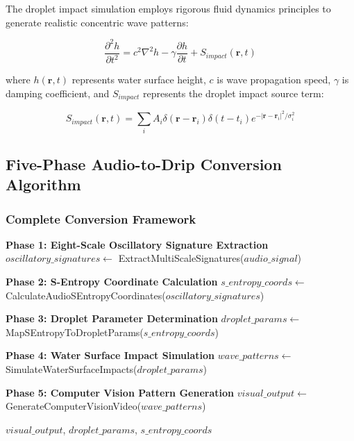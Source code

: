 The droplet impact simulation employs rigorous fluid dynamics principles to generate realistic concentric wave patterns:

\begin{equation}
\frac{\partial^2 h}{\partial t^2} = c^2 \nabla^2 h - \gamma \frac{\partial h}{\partial t} + S_{impact}(\mathbf{r}, t)
\end{equation}

where $h(\mathbf{r}, t)$ represents water surface height, $c$ is wave propagation speed, $\gamma$ is damping coefficient, and $S_{impact}$ represents the droplet impact source term:

\begin{equation}
S_{impact}(\mathbf{r}, t) = \sum_i A_i \delta(\mathbf{r} - \mathbf{r}_i) \delta(t - t_i) e^{-|\mathbf{r} - \mathbf{r}_i|^2/\sigma_i^2}
\end{equation}

\subsection{Five-Phase Audio-to-Drip Conversion Algorithm}

\subsubsection{Complete Conversion Framework}

\begin{algorithm}[H]
\caption{Universal Audio-to-Drip Conversion Algorithm}
\begin{algorithmic}[1]
    \State \textbf{Phase 1: Eight-Scale Oscillatory Signature Extraction}
    \State $oscillatory\_signatures \gets$ ExtractMultiScaleSignatures($audio\_signal$)
    
    \State \textbf{Phase 2: S-Entropy Coordinate Calculation}
    \State $s\_entropy\_coords \gets$ CalculateAudioSEntropyCoordinates($oscillatory\_signatures$)
    
    \State \textbf{Phase 3: Droplet Parameter Determination}
    \State $droplet\_params \gets$ MapSEntropyToDropletParams($s\_entropy\_coords$)
    
    \State \textbf{Phase 4: Water Surface Impact Simulation}
    \State $wave\_patterns \gets$ SimulateWaterSurfaceImpacts($droplet\_params$)
    
    \State \textbf{Phase 5: Computer Vision Pattern Generation}
    \State $visual\_output \gets$ GenerateComputerVisionVideo($wave\_patterns$)
    
    \State \Return $visual\_output$, $droplet\_params$, $s\_entropy\_coords$
\EndProcedure
\end{algorithmic}
\end{algorithm}

